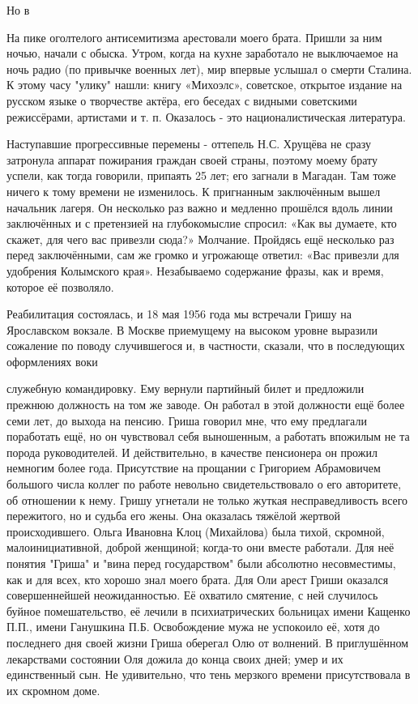 Но в

На пике оголтелого антисемитизма арестовали моего брата. Пришли за ним ночью, начали с обыска. Утром, когда на кухне заработало не выключаемое на ночь радио (по привычке военных лет), мир впервые услышал о смерти Сталина. К этому часу "улику" нашли: книгу «Михоэлс», советское, открытое издание на русском языке о творчестве актёра, его беседах с видными советскими режиссёрами, артистами и т. п. Оказалось - это националистическая литература.

Наступавшие прогрессивные перемены - оттепель Н.С. Хрущёва не сразу затронула аппарат пожирания граждан своей страны, поэтому моему брату успели, как тогда говорили, припаять 25 лет; его загнали в Магадан. Там тоже ничего к тому времени не изменилось. К пригнанным заключённым вышел начальник лагеря. Он несколько раз важно и медленно прошёлся вдоль линии заключённых и с претензией на глубокомыслие спросил: «Как вы думаете, кто скажет, для чего вас привезли сюда?» Молчание. Пройдясь ещё несколько раз перед заключёнными, сам же громко и угрожающе ответил: «Вас привезли для удобрения Колымского края». Незабываемо содержание фразы, как и время, которое её позволяло.

Реабилитация состоялась, и 18 мая 1956 года мы встречали Гришу на Ярославском вокзале. В Москве приемущему на высоком уровне выразили сожаление по поводу случившегося и, в частности, сказали, что в последующих оформлениях воки

служебную командировку. Ему вернули партийный билет и предложили прежнюю должность на том же заводе. Он работал в этой должности ещё более семи лет, до выхода на пенсию. Гриша говорил мне, что ему предлагали поработать ещё, но он чувствовал себя выношенным, а работать впожилым не та порода руководителей. И действительно, в качестве пенсионера он прожил немногим более года. Присутствие на прощании с Григорием Абрамовичем большого числа коллег по работе невольно свидетельствовало о его авторитете, об отношении к нему. Гришу угнетали не только жуткая несправедливость всего пережитого, но и судьба его жены. Она оказалась тяжёлой жертвой происходившего. Ольга Ивановна Клоц (Михайлова) была тихой, скромной, малоинициативной, доброй женщиной; когда-то они вместе работали. Для неё понятия "Гриша" и "вина перед государством" были абсолютно несовместимы, как и для всех, кто хорошо знал моего брата. Для Оли арест Гриши оказался совершеннейшей неожиданностью. Её охватило смятение, с ней случилось буйное помешательство, её лечили в психиатрических больницах имени Кащенко П.П., имени Ганушкина П.Б. Освобождение мужа не успокоило её, хотя до последнего дня своей жизни Гриша оберегал Олю от волнений. В приглушённом лекарствами состоянии Оля дожила до конца своих дней; умер и их единственный сын. Не удивительно, что тень мерзкого времени присутствовала в их скромном доме.

